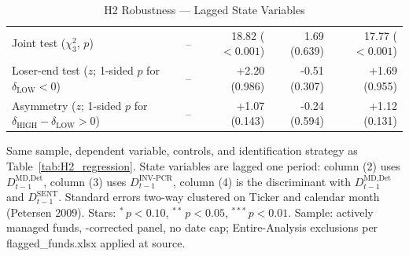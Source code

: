 \begin{table}[!htbp]
{\begin{tabular*}{\linewidth}{@{\extracolsep{\fill}}lrrrr}
Joint test ($\chi^2_3$, $p$) & -- & 18.82 ($<0.001$) & 1.69 (0.639) & 17.77 ($<0.001$)\\
Loser-end test ($z$; 1-sided $p$ for $\delta_{\text{LOW}}<0$) & -- & +2.20 (0.986) & -0.51 (0.307) & +1.69 (0.955)\\
Asymmetry ($z$; 1-sided $p$ for $\delta_{\text{HIGH}}-\delta_{\text{LOW}}>0$) & -- & +1.07 (0.143) & -0.24 (0.594) & +1.12 (0.131)\\
\bottomrule
\end{tabular*}%
}\sbefit
\fi
\setlength{\tabletempwidth}{\wd\tabletempbox}
\ifdim\tabletempwidth>\linewidth\setlength{\tabletempwidth}{\linewidth}\fi
\begin{minipage}{\tabletempwidth}
\captionsetup{width=\linewidth}
\caption{H2 Robustness --- Lagged State Variables}\label{tab:H2_lagged}
\ifdim\wd\tabletempbox>\linewidth
  \resizebox{\linewidth}{!}{\usebox{\tabletempbox}}
\else
  \usebox{\tabletempbox}
\fi
\par\medskip
\begin{singlespace}\tablefont\noindent
Same sample, dependent variable, controls, and identification strategy as Table~\ref{tab:H2_regression}. State variables are lagged one period: column (2) uses $D^{\text{MD,Det}}_{t-1}$, column (3) uses $D^{\text{INV-PCR}}_{t-1}$, column (4) is the discriminant with $D^{\text{MD,Det}}_{t-1}$ and $D^{\text{SENT}}_{t-1}$. Standard errors two-way clustered on Ticker and calendar month (Petersen 2009). Stars: $^{*}\,p<0.10$, $^{**}\,p<0.05$, $^{***}\,p<0.01$. Sample: actively managed funds, \textcite{Evans2010}-corrected panel, no date cap; Entire-Analysis exclusions per flagged\_funds.xlsx applied at source.
\end{singlespace}
\end{minipage}
\end{table}

